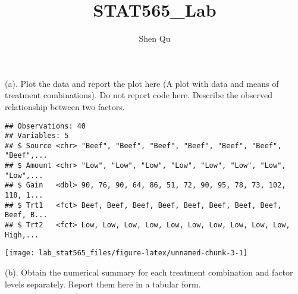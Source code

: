 \documentclass[]{article}
\title{STAT565\_Lab}
\author{Shen Qu}
\date{}
\begin{document}
\maketitle

(a).
\textcolor[rgb]{0.5,0.5,0.5}{Plot the data and report the plot here (A plot with data and means of treatment combinations). Do not report code here. Describe the observed relationship between two factors.}

\begin{verbatim}
## Observations: 40
## Variables: 5
## $ Source <chr> "Beef", "Beef", "Beef", "Beef", "Beef", "Beef", "Beef",...
## $ Amount <chr> "Low", "Low", "Low", "Low", "Low", "Low", "Low", "Low",...
## $ Gain   <dbl> 90, 76, 90, 64, 86, 51, 72, 90, 95, 78, 73, 102, 118, 1...
## $ Trt1   <fct> Beef, Beef, Beef, Beef, Beef, Beef, Beef, Beef, Beef, B...
## $ Trt2   <fct> Low, Low, Low, Low, Low, Low, Low, Low, Low, Low, High,...
\end{verbatim}

\texttt{[image: lab\_stat565\_files/figure-latex/unnamed-chunk-3-1]}

(b).
\textcolor[rgb]{0.5,0.5,0.5}{Obtain the numerical summary for each treatment combination and factor levels separately. Report them here in a tabular form.}
\end{document}
